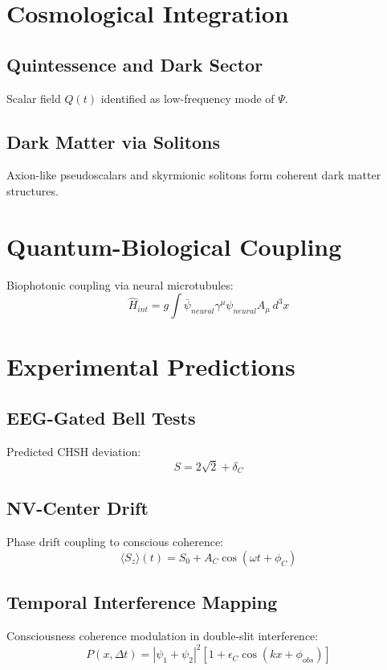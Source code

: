 \documentclass[11pt,a4paper]{article}
\begin{document}
\section{Cosmological Integration}
\subsection{Quintessence and Dark Sector}
Scalar field $Q(t)$ identified as low-frequency mode of $\Psi$.

\subsection{Dark Matter via Solitons}
Axion-like pseudoscalars and skyrmionic solitons form coherent dark matter structures.

\section{Quantum-Biological Coupling}
Biophotonic coupling via neural microtubules:
\begin{equation}
\hat H_{int} = g \int \bar\psi_{neural}\gamma^\mu\psi_{neural}A_\mu\,d^3x
\end{equation}

\section{Experimental Predictions}
\subsection{EEG-Gated Bell Tests}
Predicted CHSH deviation:
\begin{equation}
S=2\sqrt2+\delta_C
\end{equation}

\subsection{NV-Center Drift}
Phase drift coupling to conscious coherence:
\begin{equation}
\langle S_z\rangle(t)=S_0+A_C\cos(\omega t+\phi_C)
\end{equation}

\subsection{Temporal Interference Mapping}
Consciousness coherence modulation in double-slit interference:
\begin{equation}
P(x,\Delta t)=|\psi_1+\psi_2|^2[1+\epsilon_C\cos(kx+\phi_{obs})]
\end{equation}
\end{document}

